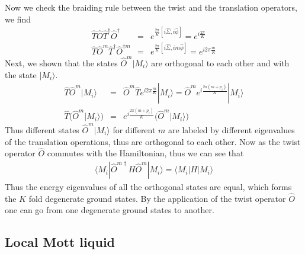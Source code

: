\documentclass[reprint,prb,superscriptaddress]{revtex4-2}
\begin{document}
Now we check the braiding rule between the twist and the translation operators, we find
\begin{eqnarray}
\hat{T}\hat{O}\hat{T}^{\dagger}\hat{O}^{\dagger} &=& e^{\frac{2\pi }{K}[i\hat{\Sigma},i\hat{\phi}]}=e^{i\frac{2\pi }{K}} \nonumber\\
\hat{T}\hat{O}^m\hat{T}^{\dagger}\hat{O}^{\dagger m} &=& e^{\frac{2\pi }{K}[i\hat{\Sigma},im\hat{\phi}]}=e^{i2\pi \frac{m}{K}}
\end{eqnarray}
Next, we shown that the states $\hat{O}^m |M_i\rangle$ are orthogonal to each other and with the state $|M_i\rangle$.
\begin{eqnarray}
\hat{T} \hat{O}^m |M_i\rangle &=& \hat{O}^m \hat{T} e^{i2\pi \frac{m}{K}} |M_i\rangle =\hat{O}^m e^{i \frac{2\pi(m+p_i)}{K} } |M_i\rangle \nonumber\\
\hat{T} \bigg(\hat{O}^m |M_i\rangle \bigg) &=&  e^{i \frac{2\pi(m+p_i)}{K} } \bigg( \hat{O}^m |M_i\rangle \bigg)
\end{eqnarray}
Thus different states $ \hat{O}^m |M_i\rangle$ for different $m$ are labeled by different eigenvalues of the translation operations, thus are orthogonal to each other. Now as the twist operator $\hat{O}$ commutes with the Hamiltonian, thus we can see that 
\begin{eqnarray}
\langle M_i| \hat{O}^{m \dagger}  H \hat{O}^m |M_i\rangle =\langle M_i|  H |M_i\rangle 
\end{eqnarray}
Thus the energy eigenvalues of all the orthogonal states are equal, which forms the $K$ fold degenerate ground states. By the application of the twist operator $\hat{O}$ one can go from one degenerate ground states to another.





\subsection{Local Mott liquid}
\label{sec:loc_mott_liquid}
\end{document}
